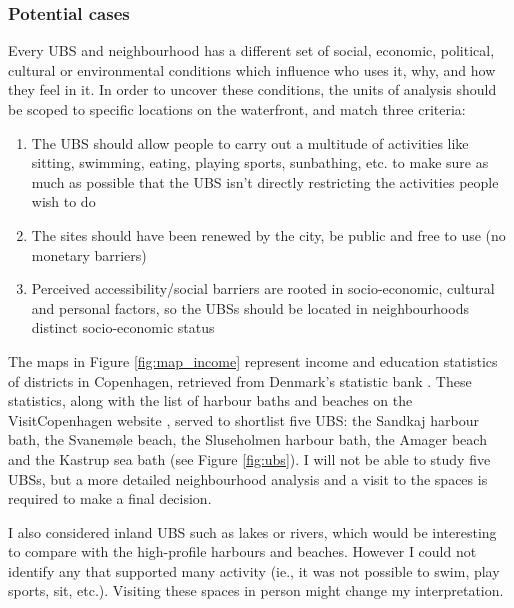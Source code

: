 \documentclass{article}
\begin{document}

\subsubsection{Potential cases}

Every UBS and neighbourhood has a different set of social, economic, political, cultural or environmental conditions which influence who uses it, why, and how they feel in it. In order to uncover these conditions, the units of analysis should be scoped to specific locations on the waterfront, and match three criteria:

\begin{enumerate}
	\item The UBS should allow people to carry out a multitude of activities like sitting, swimming, eating, playing sports, sunbathing, etc. to make sure as much as possible that the UBS isn't directly restricting the activities people wish to do
	\item The sites should have been renewed by the city, be public and free to use (no monetary barriers)
	\item Perceived accessibility/social barriers are rooted in socio-economic, cultural and personal factors, so the UBSs should be located in neighbourhoods distinct socio-economic status
\end{enumerate}

The maps in Figure \ref{fig:map_income} represent income and education statistics of districts in Copenhagen, retrieved from Denmark's statistic bank \parencite{copenhagenStatbank}. These statistics, along with the list of harbour baths and beaches on the VisitCopenhagen website \parencite{visitcopenhagen_baths}, served to shortlist five UBS: the Sandkaj harbour bath, the Svanemøle beach, the Sluseholmen harbour bath, the Amager beach and the Kastrup sea bath (see Figure \ref{fig:ubs}). I will not be able to study five UBSs, but a more detailed neighbourhood analysis and a visit to the spaces is required to make a final decision. 

I also considered inland UBS such as lakes or rivers, which would be interesting to compare with the high-profile harbours and beaches. However I could not identify any that supported many activity (ie., it was not possible to swim, play sports, sit, etc.). Visiting these spaces in person might change my interpretation.
\end{document}
